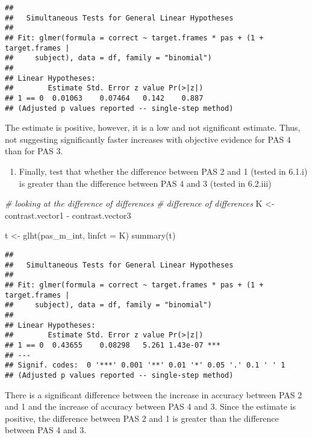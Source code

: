 \documentclass[
]{article}
\newenvironment{Shaded}{\begin{snugshade}}{\end{snugshade}}
\newcommand{\AttributeTok}[1]{\textcolor[rgb]{0.77,0.63,0.00}{#1}}
\newcommand{\CommentTok}[1]{\textcolor[rgb]{0.56,0.35,0.01}{\textit{#1}}}
\newcommand{\FunctionTok}[1]{\textcolor[rgb]{0.00,0.00,0.00}{#1}}
\newcommand{\NormalTok}[1]{#1}
\newcommand{\OtherTok}[1]{\textcolor[rgb]{0.56,0.35,0.01}{#1}}
\newcommand{\SpecialCharTok}[1]{\textcolor[rgb]{0.00,0.00,0.00}{#1}}
\providecommand{\tightlist}{%
  \setlength{\itemsep}{0pt}\setlength{\parskip}{0pt}}
\begin{document}
\begin{verbatim}
## 
##   Simultaneous Tests for General Linear Hypotheses
## 
## Fit: glmer(formula = correct ~ target.frames * pas + (1 + target.frames | 
##     subject), data = df, family = "binomial")
## 
## Linear Hypotheses:
##        Estimate Std. Error z value Pr(>|z|)
## 1 == 0  0.01063    0.07464   0.142    0.887
## (Adjusted p values reported -- single-step method)
\end{verbatim}

The estimate is positive, however, it is a low and not significant
estimate. Thus, not suggesting significantly faster increases with
objective evidence for PAS 4 than for PAS 3.

\begin{enumerate}
\def\labelenumi{\arabic{enumi})}
\setcounter{enumi}{2}
\tightlist
\item
  Finally, test that whether the difference between PAS 2 and 1 (tested
  in 6.1.i) is greater than the difference between PAS 4 and 3 (tested
  in 6.2.iii)
\end{enumerate}

\begin{Shaded}
\begin{Highlighting}[]
\CommentTok{\# looking at the difference of differences}
\CommentTok{\# difference of differences}
\NormalTok{K }\OtherTok{\textless{}{-}}\NormalTok{ contrast.vector1 }\SpecialCharTok{{-}}\NormalTok{ contrast.vector3}


\NormalTok{t }\OtherTok{\textless{}{-}} \FunctionTok{glht}\NormalTok{(pas\_m\_int, }\AttributeTok{linfct =}\NormalTok{ K)}
\FunctionTok{summary}\NormalTok{(t)}
\end{Highlighting}
\end{Shaded}

\begin{verbatim}
## 
##   Simultaneous Tests for General Linear Hypotheses
## 
## Fit: glmer(formula = correct ~ target.frames * pas + (1 + target.frames | 
##     subject), data = df, family = "binomial")
## 
## Linear Hypotheses:
##        Estimate Std. Error z value Pr(>|z|)    
## 1 == 0  0.43655    0.08298   5.261 1.43e-07 ***
## ---
## Signif. codes:  0 '***' 0.001 '**' 0.01 '*' 0.05 '.' 0.1 ' ' 1
## (Adjusted p values reported -- single-step method)
\end{verbatim}

There is a significant difference between the increase in accuracy
between PAS 2 and 1 and the increase of accuracy between PAS 4 and 3.
Since the estimate is positive, the difference between PAS 2 and 1 is
greater than the difference between PAS 4 and 3.
\end{document}
